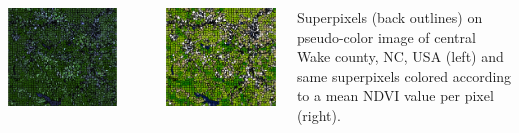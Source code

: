 \documentclass[25pt, margin=0mm, innermargin=15mm, blockverticalspace=15mm, colspace=15mm, subcolspace=8mm]{tikzposter}
\begin{document}
\begin{columns}
{\begin{minipage}{0.5\linewidth}
\begin{center}
\includegraphics[width=\textwidth]{superpixels_slic_pseudo}
\end{center}
\end{minipage}
~
\begin{minipage}{0.5\linewidth}
\begin{center}
\includegraphics[width=\textwidth]{superpixels_slic_colored}
\end{center}
\end{minipage}
\vspace{2mm}
\begin{center}
Superpixels (back outlines) on pseudo-color image of central Wake county, NC, USA (left)
and same superpixels colored according to a mean NDVI value per pixel (right).
\end{center}

}
\end{columns}
\end{document}
